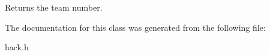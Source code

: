\begin{DoxyReturn}{Returns}
the team number. 
\end{DoxyReturn}


The documentation for this class was generated from the following file\-:\begin{DoxyCompactItemize}
\item 
hack.\-h\end{DoxyCompactItemize}
